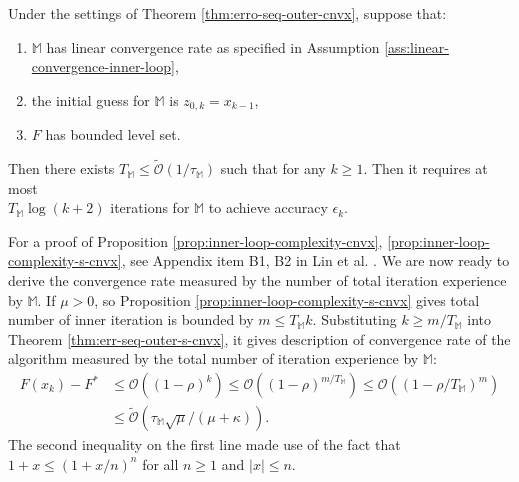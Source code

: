 \documentclass[12pt]{article}
\begin{document}
            \begin{proposition}\label{prop:inner-loop-complexity-cnvx}
                Under the settings of Theorem \ref{thm:erro-seq-outer-cnvx}, suppose that:
                \begin{enumerate}
                    \item $\mathbb M$ has linear convergence rate as specified in Assumption \ref{ass:linear-convergence-inner-loop}, 
                    \item the initial guess for $\mathbb M$ is $z_{0, k} = x_{k - 1}$, 
                    \item $F$ has bounded level set.
                \end{enumerate}
                Then there exists $T_{\mathbb M} \le \widetilde{\mathcal O}(1 / \tau_{\mathbb M})$ such that for any $k \ge 1$. 
                Then it requires at most\\ $T_{\mathbb M}\log(k + 2)$ iterations for $\mathbb M$ to achieve accuracy $\epsilon_k$.    
            \end{proposition}
            For a proof of Proposition \ref{prop:inner-loop-complexity-cnvx}, \ref{prop:inner-loop-complexity-s-cnvx}, see Appendix item B1, B2 in Lin et al. \cite{lin_universal_2015}. 
            We are now ready to derive the convergence rate measured by the number of total iteration experience by $\mathbb M$. 
            If $\mu > 0$, so Proposition \ref{prop:inner-loop-complexity-s-cnvx} gives total number of inner iteration is bounded by $m \le T_{\mathbb M}k$. 
            Substituting $k \ge m/T_{\mathbb M}$ into Theorem \ref{thm:err-seq-outer-s-cnvx}, it gives description of convergence rate of the algorithm measured by the total number of iteration experience by $\mathbb M$: 
            \begin{align*}
                F(x_k) - F^* &\le \mathcal O \left(
                    (1 - \rho)^k 
                \right) \le 
                \mathcal O \left(
                    (1 - \rho)^{m/ T_{\mathbb M}}
                \right) \le 
                \mathcal O\left(
                    \left(1 - \rho/T_{\mathbb M}\right)^{m}
                \right)
                \\
                &\le \widetilde{\mathcal O}\left(
                    \tau_{\mathbb M}\sqrt{\mu}/(\mu + \kappa)
                \right). 
            \end{align*}
            The second inequality on the first line made use of the fact that $1 + x \le (1 + x/n)^n$ for all $n \ge 1$ and $|x| \le n$. 
\end{document}
